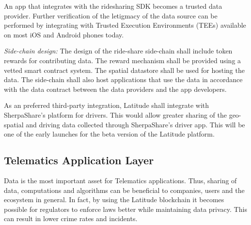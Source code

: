 An app that integrates with the ridesharing SDK becomes a trusted data provider. Further verification of the letigmacy
of the data source can be performed by integrating with Trusted Execution Environments (TEEs) available on most iOS and
Android phones today.

\noindent
{\em Side-chain design:} The design of the ride-share side-chain shall include token rewards for contributing data. The
reward mechanism shall be provided using a vetted smart contract system. The spatial datastore shall be used for hosting
the data. The side-chain shall also host applications that use the data in accordance with the data contract between the
data providers and the app developers.

As an preferred third-party integration, Latitude shall integrate with SherpaShare's platform for drivers. This would
allow greater sharing of the geo-spatial and driving data collected through SherpaShare's driver app. This will be one
of the early launches for the beta version of the Latitude platform.

%
%
%

\subsection{Telematics Application Layer}

Data is the most important asset for Telematics applications. Thus, sharing of data, computations and algorithms can be
beneficial to companies, users and the ecosystem in general. In fact, by using the Latitude blockchain it becomes
possible for regulators to enforce laws better while maintaining data privacy. This can result in lower crime rates and
incidents.


